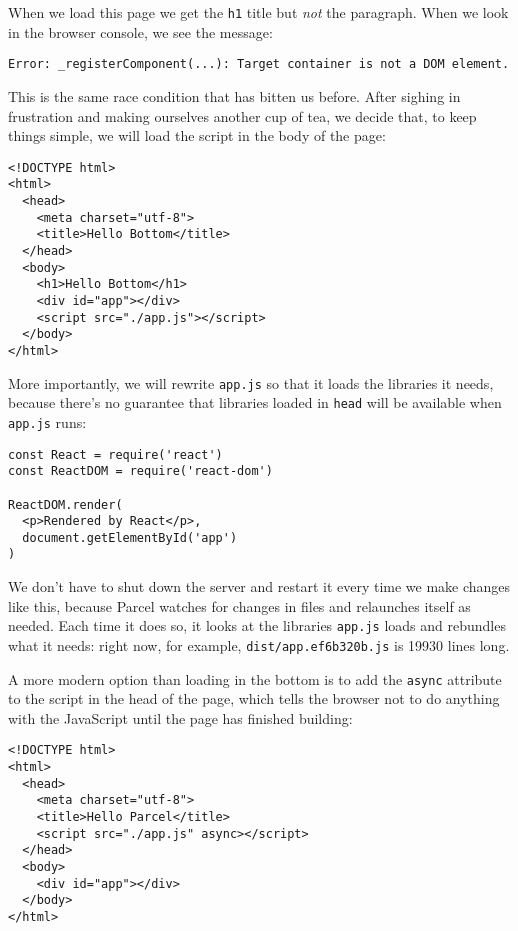 When we load this page we get the \texttt{h1} title but \emph{not} the paragraph.
When we look in the browser console,
we see the message:

\begin{verbatim}
Error: _registerComponent(...): Target container is not a DOM element.
\end{verbatim}

This is the same race condition that has bitten us before.
After sighing in frustration and making ourselves another cup of tea,
we decide that,
to keep things simple,
we will load the script in the body of the page:

\begin{verbatim}
<!DOCTYPE html>
<html>
  <head>
    <meta charset="utf-8">
    <title>Hello Bottom</title>
  </head>
  <body>
    <h1>Hello Bottom</h1>
    <div id="app"></div>
    <script src="./app.js"></script>
  </body>
</html>
\end{verbatim}

More importantly,
we will rewrite \texttt{app.js} so that it loads the libraries it needs,
because there's no guarantee that libraries loaded in \texttt{head} will be available when \texttt{app.js} runs:

\begin{verbatim}
const React = require('react')
const ReactDOM = require('react-dom')

ReactDOM.render(
  <p>Rendered by React</p>,
  document.getElementById('app')
)
\end{verbatim}

We don't have to shut down the server and restart it every time we make changes like this,
because Parcel watches for changes in files and relaunches itself as needed.
Each time it does so,
it looks at the libraries \texttt{app.js} loads and rebundles what it needs:
right now,
for example,
\texttt{dist/app.ef6b320b.js} is 19930 lines long.

A more modern option than loading in the bottom is to add the \texttt{async} attribute to the script in the head of the page,
which tells the browser not to do anything with the JavaScript until the page has finished building:

\begin{verbatim}
<!DOCTYPE html>
<html>
  <head>
    <meta charset="utf-8">
    <title>Hello Parcel</title>
    <script src="./app.js" async></script>
  </head>
  <body>
    <div id="app"></div>
  </body>
</html>
\end{verbatim}

